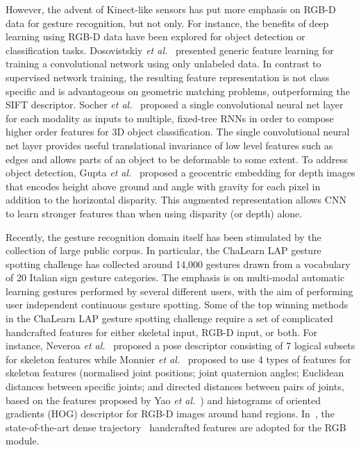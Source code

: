 However, the advent of  Kinect-like sensors has put more emphasis on RGB-D data for gesture recognition, but not only.
For instance, the benefits of deep learning using RGB-D data have been explored for object detection or classification tasks.
%
Dosovistskiy \emph{et al.}~\cite{DosovitskiySRB14} presented generic feature learning for training a convolutional network using only unlabeled data. In contrast to supervised network training, the resulting feature representation is not class specific and is advantageous on geometric matching problems, outperforming the SIFT descriptor.
Socher \emph{et al.}~\cite{socher2012convolutional} proposed a single convolutional neural net layer for each modality as inputs to multiple, fixed-tree RNNs in order to compose higher order features for 3D object classification. The single convolutional neural net layer provides useful translational invariance of low level features such as edges and allows parts of an object to be deformable to some extent.
To address object detection, Gupta \emph{et al.}~\cite{gupta2014learning} proposed a geocentric embedding for depth images that encodes height above ground and angle with gravity for each pixel in addition to the horizontal disparity.
This augmented representation allows CNN to learn stronger features than when using disparity (or depth) alone.

Recently, the gesture recognition domain itself has been stimulated by the collection of large public corpus. In particular, the ChaLearn LAP \cite{chalearnLAP} gesture spotting challenge has collected around 14,000 gestures drawn from a vocabulary of 20 Italian sign gesture categories. The emphasis is on multi-modal automatic learning gestures performed by several different users, with the aim of performing user independent continuous gesture spotting.
Some of the top winning methods in the ChaLearn LAP gesture spotting challenge require a set of complicated handcrafted features for either skeletal input, RGB-D input, or both.
For instance, Neveroa \emph{et al.}~\cite{neverova2014multi} proposed a pose descriptor consisting of 7 logical subsets for skeleton features while Monnier \emph{et al.}~\cite{Monnier2014multi} proposed to use 4 types of features for skeleton features (normalised joint positions; joint quaternion angles; Euclidean distances between specific joints; and directed distances between pairs of joints, based on the features proposed by Yao \emph{et al.}~\cite{yao2011does}) and histograms of oriented gradients (HOG) descriptor for RGB-D images around hand regions.
In~\cite{Peng2014multi}, the state-of-the-art dense trajectory~\cite{wang2013dense} handcrafted features are adopted for the RGB module.

